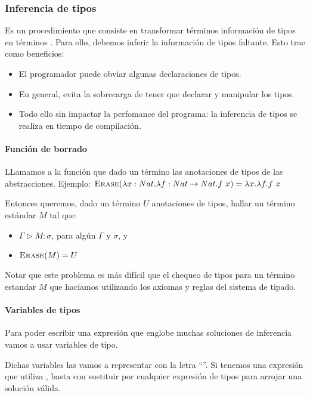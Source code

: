 \subsubsection{Inferencia de tipos}

Es un procedimiento que consiste en transformar términos  información de tipos en términos . Para ello, debemos inferir la información de tipos faltante. Esto trae como beneficios:

\begin{itemize}
  \item El programador puede obviar algunas declaraciones de tipos.
  \item En general, evita la sobrecarga de tener que declarar y manipular  los tipos.
  \item Todo ello sin impactar la perfomance del programa: la inferencia de tipos se realiza en tiempo de compilación.
\end{itemize}

\paragraph{Función de borrado}

LLamamos \erase{\cdot} a la función que dado un término  las anotaciones de tipos de las abstracciones. Ejemplo: $\textsc{Erase}(\lambda x:Nat.\lambda f:Nat\to Nat.f\ x) = \lambda x.\lambda f.f\ x$

Entonces queremos, dado un término $U$  anotaciones de tipos, hallar un término estándar $M$ tal que:
\begin{itemize}
  \item $\Gamma \rhd M : \sigma$, para algún $\Gamma$ y $\sigma$, y
  \item $\textsc{Erase}(M) = U$
\end{itemize}

Notar que este problema es más difícil que el chequeo de tipos para un término estandar $M$ que haciamos utilizando los axiomas y reglas del sistema de tipado.

\paragraph{Variables de tipos}

Para poder escribir una  expresión que englobe muchas soluciones de inferencia vamos a usar variables de tipo.

Dichas variables las vamos a representar con la letra ``''. Si tenemos una expresión que utiliza , basta con sustituir  por cualquier expresión de tipos para arrojar una solución válida.

